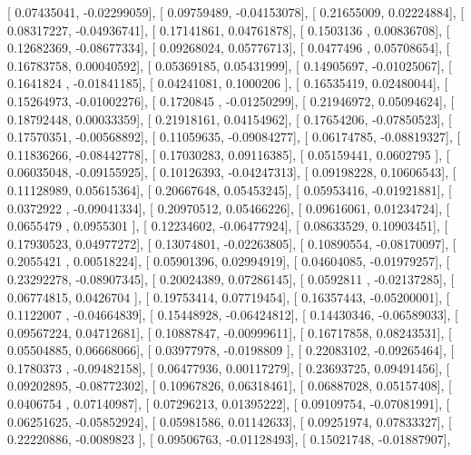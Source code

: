 \documentclass{article}
\begin{document}
       [ 0.07435041, -0.02299059],
       [ 0.09759489, -0.04153078],
       [ 0.21655009,  0.02224884],
       [ 0.08317227, -0.04936741],
       [ 0.17141861,  0.04761878],
       [ 0.1503136 ,  0.00836708],
       [ 0.12682369, -0.08677334],
       [ 0.09268024,  0.05776713],
       [ 0.0477496 ,  0.05708654],
       [ 0.16783758,  0.00040592],
       [ 0.05369185,  0.05431999],
       [ 0.14905697, -0.01025067],
       [ 0.1641824 , -0.01841185],
       [ 0.04241081,  0.1000206 ],
       [ 0.16535419,  0.02480044],
       [ 0.15264973, -0.01002276],
       [ 0.1720845 , -0.01250299],
       [ 0.21946972,  0.05094624],
       [ 0.18792448,  0.00033359],
       [ 0.21918161,  0.04154962],
       [ 0.17654206, -0.07850523],
       [ 0.17570351, -0.00568892],
       [ 0.11059635, -0.09084277],
       [ 0.06174785, -0.08819327],
       [ 0.11836266, -0.08442778],
       [ 0.17030283,  0.09116385],
       [ 0.05159441,  0.0602795 ],
       [ 0.06035048, -0.09155925],
       [ 0.10126393, -0.04247313],
       [ 0.09198228,  0.10606543],
       [ 0.11128989,  0.05615364],
       [ 0.20667648,  0.05453245],
       [ 0.05953416, -0.01921881],
       [ 0.0372922 , -0.09041334],
       [ 0.20970512,  0.05466226],
       [ 0.09616061,  0.01234724],
       [ 0.0655479 ,  0.0955301 ],
       [ 0.12234602, -0.06477924],
       [ 0.08633529,  0.10903451],
       [ 0.17930523,  0.04977272],
       [ 0.13074801, -0.02263805],
       [ 0.10890554, -0.08170097],
       [ 0.2055421 ,  0.00518224],
       [ 0.05901396,  0.02994919],
       [ 0.04604085, -0.01979257],
       [ 0.23292278, -0.08907345],
       [ 0.20024389,  0.07286145],
       [ 0.0592811 , -0.02137285],
       [ 0.06774815,  0.0426704 ],
       [ 0.19753414,  0.07719454],
       [ 0.16357443, -0.05200001],
       [ 0.1122007 , -0.04664839],
       [ 0.15448928, -0.06424812],
       [ 0.14430346, -0.06589033],
       [ 0.09567224,  0.04712681],
       [ 0.10887847, -0.00999611],
       [ 0.16717858,  0.08243531],
       [ 0.05504885,  0.06668066],
       [ 0.03977978, -0.0198809 ],
       [ 0.22083102, -0.09265464],
       [ 0.1780373 , -0.09482158],
       [ 0.06477936,  0.00117279],
       [ 0.23693725,  0.09491456],
       [ 0.09202895, -0.08772302],
       [ 0.10967826,  0.06318461],
       [ 0.06887028,  0.05157408],
       [ 0.0406754 ,  0.07140987],
       [ 0.07296213,  0.01395222],
       [ 0.09109754, -0.07081991],
       [ 0.06251625, -0.05852924],
       [ 0.05981586,  0.01142633],
       [ 0.09251974,  0.07833327],
       [ 0.22220886, -0.0089823 ],
       [ 0.09506763, -0.01128493],
       [ 0.15021748, -0.01887907],
\end{document}
